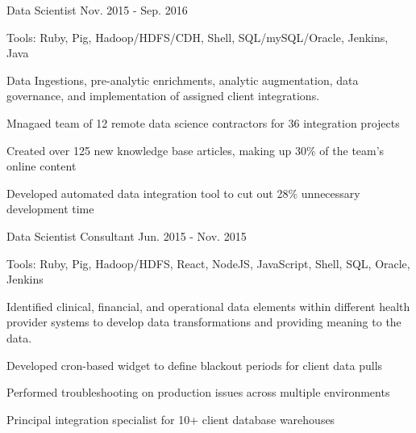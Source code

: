 \begin{cventries}
  \cvexpsubposition
    {Data Scientist} %
    {Nov. 2015 - Sep. 2016} %
    {}
    {
      \begin{cvheavyparagraph}
        Tools: Ruby, Pig, Hadoop/HDFS/CDH, Shell, SQL/mySQL/Oracle, Jenkins, Java
      \end{cvheavyparagraph}
    }
    {
      \begin{cvparagraph}
        Data Ingestions, pre-analytic enrichments, analytic augmentation, data governance, and implementation of assigned client integrations.
      \end{cvparagraph}
      \begin{cvitems} %
        \item {Mnagaed team of 12 remote data science contractors for 36 integration projects}
        \item {Created over 125 new knowledge base articles, making up 30\% of the team's online content}
        \item {Developed automated data integration tool to cut out 28\% unnecessary development time}
      \end{cvitems}
    }

  \cvexpsubposition
    {Data Scientist Consultant} %
    {Jun. 2015 - Nov. 2015} %
    {}
    {
      \begin{cvheavyparagraph}
        Tools: Ruby, Pig, Hadoop/HDFS, React, NodeJS, JavaScript, Shell, SQL, Oracle, Jenkins
      \end{cvheavyparagraph}
    }
    {
      \begin{cvparagraph}
        Identified clinical, financial, and operational data elements within different health provider systems to develop data transformations and providing meaning to the data. 
      \end{cvparagraph}
      \begin{cvitems} %
        \item {Developed cron-based widget to define blackout periods for client data pulls}
        \item {Performed troubleshooting on production issues across multiple environments}
        \item {Principal integration specialist for 10+ client database warehouses}
      \end{cvitems}
    }


\end{cventries}
